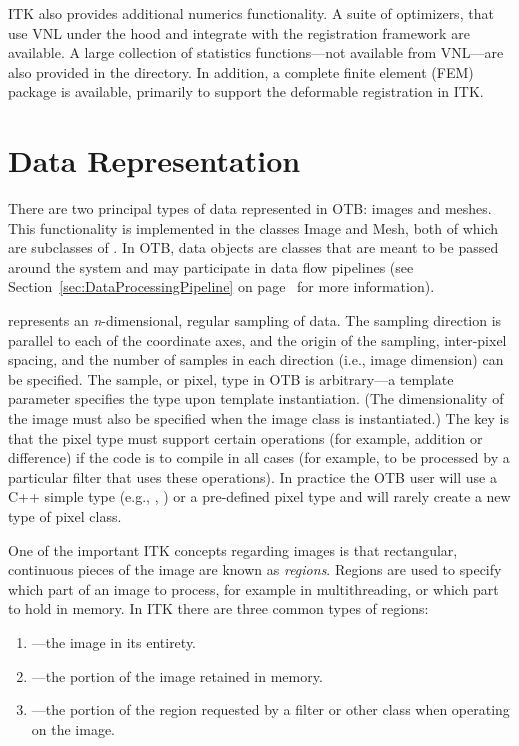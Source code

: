ITK also provides additional numerics functionality. A suite of optimizers, that
use VNL under the hood and integrate with the registration framework
are available. A large collection of statistics functions---not available from
VNL---are also provided in the 
directory. In addition, a complete finite element (FEM) package is available,
primarily to support the deformable registration in ITK.


\section{Data Representation}
\label{sec:DataRepresentationAndAccess}


There are two principal types of data represented in OTB: images and
meshes. This functionality is implemented in the classes 
Image and Mesh, both of which are subclasses of
. In OTB, data objects are classes that are meant to
be passed around the system and may participate in data flow pipelines (see
Section~\ref{sec:DataProcessingPipeline} on
page~\pageref{sec:DataProcessingPipeline} for more information).



 represents an \emph{n}-dimensional, regular sampling of
data. The sampling direction is parallel to each of the coordinate axes, and
the origin of the sampling, inter-pixel spacing, and the number of samples in
each direction (i.e., image dimension) can be specified. The sample, or
pixel, type in OTB is arbitrary---a template parameter 
specifies the type upon template instantiation. (The dimensionality of the
image must also be specified when the image class is instantiated.) The key
is that the pixel type must support certain operations (for example, addition
or difference) if the code is to compile in all cases (for example, to be
processed by a particular filter that uses these operations). In practice the
OTB user will use a C++ simple type (e.g., , ) or a pre-defined pixel
type and will rarely create a new type of pixel class.

One of the important ITK concepts regarding images is that rectangular,
continuous pieces of the image are known as \emph{regions}. Regions are used
to specify which part of an image to process, for example in multithreading,
or which part to hold in memory. In ITK there are three common types of
regions:
\begin{enumerate}
\item {}---the image in its entirety.
\item {}---the portion of the image retained in memory.
\item {}---the portion of the region requested by a 
filter or other class when operating on the image.
\end{enumerate}

